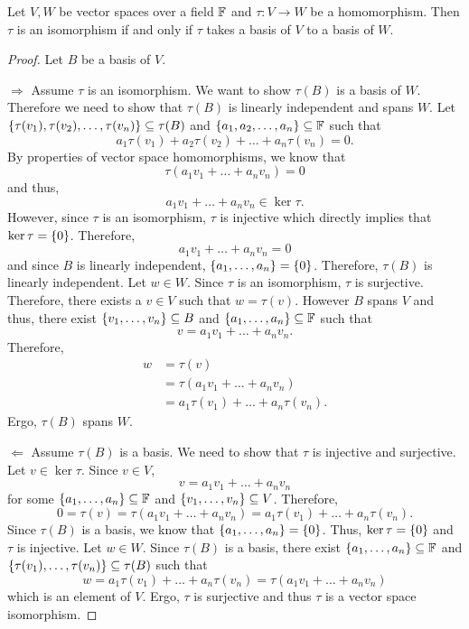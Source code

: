 \documentclass[notitlepage]{simple}
\begin{document}
	\begin{thm}
		Let $V,W$ be vector spaces over a field $\mathbb{F}$ and $\tau: V\rightarrow W$ be a homomorphism.
		Then $\tau$ is an isomorphism if and only if $\tau$ takes a basis of $V$ to a basis of $W$.
	\end{thm}
	\begin{proof}
		Let $B$ be a basis of $V$.

		$\Rightarrow$ Assume $\tau$ is an isomorphism.
		We want to show $\tau(B)$ is a basis of $W$.
		Therefore we need to show that $\tau(B)$ is linearly independent and spans $W$.
		Let $\lbrace \tau(v_1),\tau(v_2),\ldots,\tau(v_n) \rbrace\subseteq\tau(B)$ and $\lbrace a_1,a_2,\ldots,a_n \rbrace\subseteq\mathbb{F}$ such that
		\[
			a_1\tau(v_1)+a_2\tau(v_2)+\ldots+a_n\tau(v_n)=0.
		\]
		By properties of vector space homomorphisms, we know that
		\[
			\tau(a_1v_1+\ldots+a_nv_n)=0
		\]
		and thus,
		\[
			a_1v_1+\ldots +a_nv_n\in\ker\tau.
		\]
		However, since $\tau$ is an isomorphism, $\tau$ is injective which directly implies that $\ker\tau=\lbrace 0 \rbrace$.
		Therefore,
		\[
			a_1v_1+\ldots +a_nv_n = 0
		\]
		and since $B$ is linearly independent, $\lbrace a_1,\ldots,a_n \rbrace=\lbrace 0 \rbrace$.
		Therefore, $\tau(B)$ is linearly independent.
		Let $w\in W$.
		Since $\tau$ is an isomorphism, $\tau$ is surjective.
		Therefore, there exists a $v\in V$ such that $w=\tau(v)$.
		However $B$ spans $V$ and thus, there exist $\lbrace v_1,\ldots,v_n \rbrace\subseteq B$ and $\lbrace a_1,\ldots,a_n \rbrace\subseteq\mathbb{F}$ such that
		\[
			v=a_1v_1+\ldots+a_nv_n.
		\]
		Therefore,
		\begin{align*}
			w &= \tau(v)\\
			&=\tau(a_1v_1+\ldots+a_nv_n)\\
			&=a_1\tau(v_1)+\ldots +a_n\tau(v_n).
		\end{align*}
		Ergo, $\tau(B)$ spans $W$.

		\noindent $\Leftarrow$ Assume $\tau(B)$ is a basis.
		We need to show that $\tau$ is injective and surjective.
		Let $v\in\ker\tau$.
		Since $v\in V$,
		\[
			v=a_1v_1+\ldots+a_nv_n
		\]
		for some $\lbrace a_1,\ldots,a_n \rbrace\subseteq\mathbb{F}$ and $\lbrace v_1,\ldots,v_n \rbrace\subseteq V$.
		Therefore,
		\[
			0 = \tau(v)=\tau(a_1v_1+\ldots+a_nv_n)=a_1\tau(v_1)+\ldots+a_n\tau(v_n).
		\]
		Since $\tau(B)$ is a basis, we know that $\lbrace a_1,\ldots,a_n \rbrace=\lbrace 0 \rbrace$.
		Thus, $\ker\tau=\lbrace 0 \rbrace$ and $\tau$ is injective.
		Let $w\in W$.
		Since $\tau(B)$ is a basis, there exist $\lbrace a_1,\ldots,a_n \rbrace\subseteq\mathbb{F}$ and $\lbrace \tau(v_1),\ldots,\tau(v_n) \rbrace\subseteq \tau(B)$ such that
		\[
			w=a_1\tau(v_1)+\ldots +a_n\tau(v_n)=\tau(a_1v_1+\ldots+a_nv_n)
		\]
		which is an element of $V$.
		Ergo, $\tau$ is surjective and thus $\tau$ is a vector space isomorphism.
	\end{proof}
\end{document}
